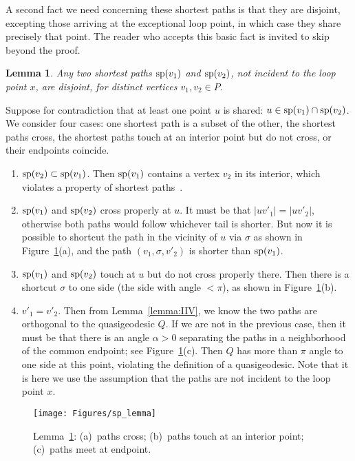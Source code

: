 \pdfoutput=1  \documentclass[]{article}
\newcommand{\ABox}{
\raisebox{3pt}{\framebox[6pt]{\rule{6pt}{0pt}}}
}
\newenvironment{proof}{{\bf Proof:}}{\hfill\ABox}
\newtheorem{lemma}[theorem]{Lemma}
\newcommand{\lemlab}[1]{\label{lemma:#1}}
\newcommand{\figlab}[1]{\label{fig:#1}}
\newcommand{\lemref}[1]{\ref{lemma:#1}}
\newcommand{\figref}[1]{\ref{fig:#1}}
\def\s{{\sigma}}
\def\a{{\alpha}}
\def\sp{\mathop{\rm sp}\nolimits}
\begin{document}
A second fact we need concerning these shortest paths is that they are disjoint,
excepting those arriving at the exceptional loop point,
in which case they share precisely that point.
The reader who accepts this basic fact is invited to skip beyond
the proof.
\begin{lemma}
Any two shortest paths 
$\sp(v_1)$ and $\sp(v_2)$,
not incident to the loop point $x$,
are disjoint,
for distinct vertices $v_1,v_2 \in P$.
\lemlab{sp.disjoint}
\end{lemma}
\begin{proof}
Suppose for contradiction that at least one point $u$ is shared:
$u \in \sp(v_1)\cap \sp(v_2)$.
We consider four cases:
one shortest path is a subset of the other,
the shortest paths cross, the shortest paths touch at an interior point
but do not cross, or their endpoints coincide.
\begin{enumerate}
\item $\sp(v_2) \subset \sp(v_1)$.
Then $\sp(v_1)$ contains a vertex $v_2$ in its interior, which violates
a property of shortest paths~\cite[Lem.~4.1]{ss-spps-86}.
\item $\sp(v_1)$ and $\sp(v_2)$ cross properly at $u$.
It must be that $|uv'_1|=|uv'_2|$, otherwise both paths
would follow whichever tail is shorter.
But now it is possible to shortcut the path in the vicinity of $u$ via
$\s$ as shown in 
Figure~\figref{sp_lemma}(a), and the path $(v_1,\s,v'_2)$ is shorter than $\sp(v_1)$.
\item $\sp(v_1)$ and $\sp(v_2)$ touch at $u$ but do not cross properly there.
Then there is a shortcut $\s$ to one side (the side with angle ${<}\pi$),
as shown in 
Figure~\figref{sp_lemma}(b).
\item $v'_1 = v'_2$.
Then from Lemma~\lemref{IIV}, we know the two paths are orthogonal to the
quasigeodesic $Q$.  If we are not in the previous case, then it
must be that there is an angle $\a > 0$ separating the paths in a neighborhood
of the common endpoint; see Figure~\figref{sp_lemma}(c).
Then $Q$ has more than $\pi$ angle to one side at
this point, violating the definition of a quasigeodesic.
Note that it is here we use the assumption that the paths
are not incident to the loop point $x$.
\end{enumerate}
\end{proof}


\begin{figure}[htbp]
\centering
\texttt{[image: Figures/sp\_lemma]}
\caption{Lemma~\protect\lemref{sp.disjoint}:
(a)~paths cross;
(b)~paths touch at an interior point;
(c)~paths meet at endpoint.}
\figlab{sp_lemma}
\end{figure}
\end{document}
